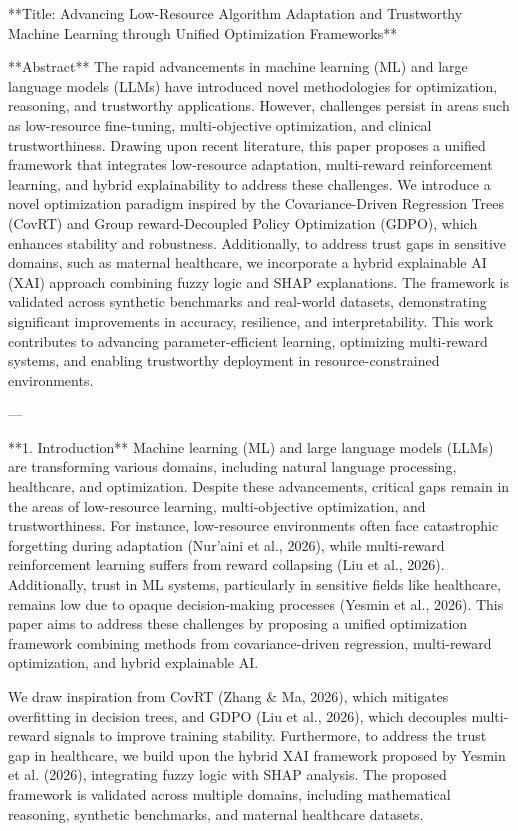 **Title: Advancing Low-Resource Algorithm Adaptation and Trustworthy Machine Learning through Unified Optimization Frameworks**

**Abstract**  
The rapid advancements in machine learning (ML) and large language models (LLMs) have introduced novel methodologies for optimization, reasoning, and trustworthy applications. However, challenges persist in areas such as low-resource fine-tuning, multi-objective optimization, and clinical trustworthiness. Drawing upon recent literature, this paper proposes a unified framework that integrates low-resource adaptation, multi-reward reinforcement learning, and hybrid explainability to address these challenges. We introduce a novel optimization paradigm inspired by the Covariance-Driven Regression Trees (CovRT) and Group reward-Decoupled Policy Optimization (GDPO), which enhances stability and robustness. Additionally, to address trust gaps in sensitive domains, such as maternal healthcare, we incorporate a hybrid explainable AI (XAI) approach combining fuzzy logic and SHAP explanations. The framework is validated across synthetic benchmarks and real-world datasets, demonstrating significant improvements in accuracy, resilience, and interpretability. This work contributes to advancing parameter-efficient learning, optimizing multi-reward systems, and enabling trustworthy deployment in resource-constrained environments.

---

**1. Introduction**  
Machine learning (ML) and large language models (LLMs) are transforming various domains, including natural language processing, healthcare, and optimization. Despite these advancements, critical gaps remain in the areas of low-resource learning, multi-objective optimization, and trustworthiness. For instance, low-resource environments often face catastrophic forgetting during adaptation (Nur’aini et al., 2026), while multi-reward reinforcement learning suffers from reward collapsing (Liu et al., 2026). Additionally, trust in ML systems, particularly in sensitive fields like healthcare, remains low due to opaque decision-making processes (Yesmin et al., 2026). This paper aims to address these challenges by proposing a unified optimization framework combining methods from covariance-driven regression, multi-reward optimization, and hybrid explainable AI.  

We draw inspiration from CovRT (Zhang & Ma, 2026), which mitigates overfitting in decision trees, and GDPO (Liu et al., 2026), which decouples multi-reward signals to improve training stability. Furthermore, to address the trust gap in healthcare, we build upon the hybrid XAI framework proposed by Yesmin et al. (2026), integrating fuzzy logic with SHAP analysis. The proposed framework is validated across multiple domains, including mathematical reasoning, synthetic benchmarks, and maternal healthcare datasets.

